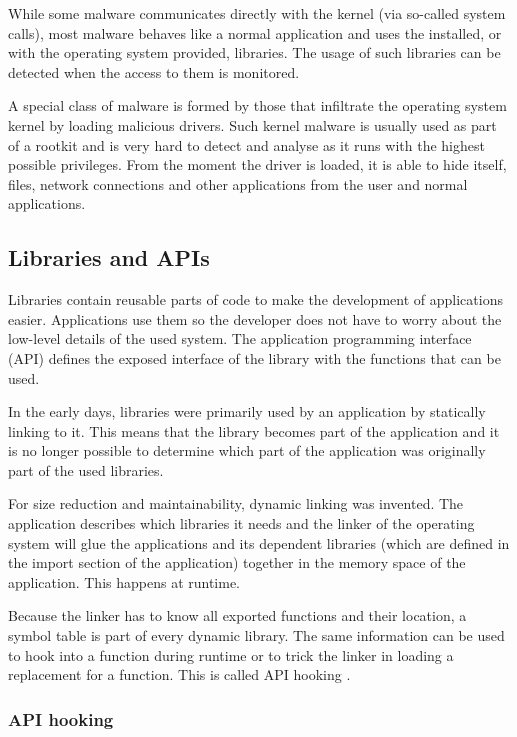 While some malware communicates directly with the kernel (via so-called system calls), most malware \cite{MaliciousAPIs} behaves like a normal application and uses the installed, or with the operating system provided, libraries. The usage of such libraries can be detected when the access to them is monitored.

A special class of malware \cite{ZeroAccess,Gameover} is formed by those that infiltrate the operating system kernel by loading malicious drivers. Such kernel malware is usually used as part of a rootkit and is very hard to detect and analyse as it runs with the highest possible privileges. From the moment the driver is loaded, it is able to hide itself, files, network connections and other applications from the user and normal applications.

\subsection{Libraries and APIs}

Libraries contain reusable parts of code to make the development of applications easier. Applications use them so the developer does not have to worry about the low-level details of the used system. The application programming interface (API) defines the exposed interface of the library with the functions that can be used.

In the early days, libraries were primarily used by an application by statically linking to it. This means that the library becomes part of the application and it is no longer possible to determine which part of the application was originally part of the used libraries.

For size reduction and maintainability, dynamic linking was invented. The application describes which libraries it needs and the linker of the operating system will glue the applications and its dependent libraries (which are defined in the import section of the application) together in the memory space of the application. This happens at runtime. 

Because the linker has to know all exported functions and their location, a symbol table is part of every dynamic library. The same information can be used to hook into a function during runtime or to trick the linker in loading a replacement for a function. This is called API hooking \cite{APIHookingRevealed}.

\subsubsection{API hooking}

